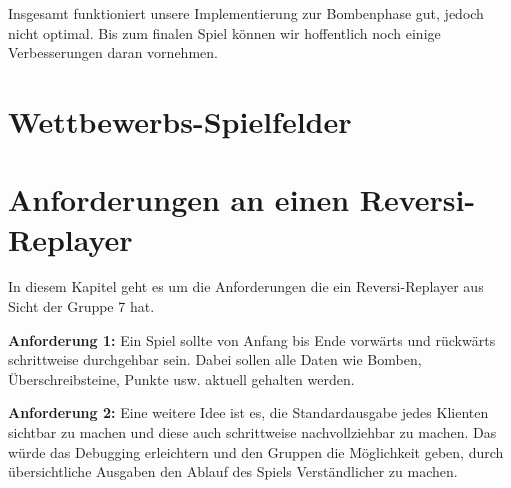 \documentclass[12pt,a4paper,bibliography=totocnumbered,listof=totocnumbered]{scrartcl}
\begin{document}
	Insgesamt funktioniert unsere Implementierung zur Bombenphase gut, jedoch nicht optimal. Bis zum finalen Spiel können wir hoffentlich noch einige Verbesserungen daran vornehmen.

    
    \section{Wettbewerbs-Spielfelder}
    \vspace{1em}

	
	\section{Anforderungen an einen Reversi-Replayer}
	\vspace{1em}
	
	In diesem Kapitel geht es um die Anforderungen die ein Reversi-Replayer aus Sicht der Gruppe 7 hat.
	
	\textbf{Anforderung 1:} Ein Spiel sollte von Anfang bis Ende vorwärts und rückwärts schrittweise durchgehbar sein. Dabei sollen alle Daten wie Bomben, Überschreibsteine, Punkte usw. aktuell gehalten werden.
	
	\textbf{Anforderung 2:} Eine weitere Idee ist es, die Standardausgabe jedes Klienten sichtbar zu machen und diese auch schrittweise nachvollziehbar zu machen. Das würde das Debugging erleichtern und den Gruppen die Möglichkeit geben, durch übersichtliche Ausgaben den Ablauf des Spiels Verständlicher zu machen.
	
\end{document}
